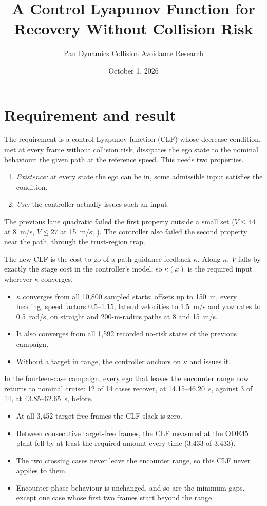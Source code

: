\documentclass[11pt]{article}
\title{A Control Lyapunov Function for Recovery Without Collision Risk}
\author{Pan Dynamics Collision Avoidance Research}
\date{October 1, 2026}
\begin{document}
\maketitle

\section{Requirement and result}
The requirement is a control Lyapunov function (CLF) whose decrease condition,
met at every frame without collision risk, dissipates the ego state to the
nominal behaviour: the given path at the reference speed. This needs two
properties.
\begin{enumerate}
\item \emph{Existence:} at every state the ego can be in, some admissible input
satisfies the condition.
\item \emph{Use:} the controller actually issues such an input.
\end{enumerate}
The previous lane quadratic failed the first property outside a small set
($V\le44$ at 8~m/s, $V\le27$ at 15~m/s;
). The controller also failed the
second property near the path, through the trust-region trap.

The new CLF is the cost-to-go of a path-guidance feedback $\kappa$. Along
$\kappa$, $V$ falls by exactly the stage cost in the controller's model, so
$\kappa(x)$ is the required input wherever $\kappa$ converges.
\begin{itemize}
\item $\kappa$ converges from all 10{,}800 sampled starts: offsets up to
150~m, every heading, speed factors 0.5--1.15, lateral velocities to 1.5~m/s
and yaw rates to 0.5~rad/s, on straight and 200-m-radius paths at 8 and
15~m/s.
\item It also converges from all 1{,}592 recorded no-risk states of the
previous campaign.
\item Without a target in range, the controller anchors on $\kappa$ and issues
it.
\end{itemize}
In the fourteen-case campaign, every ego that leaves the encounter range now
returns to nominal cruise: 12 of 14 cases recover, at 14.15--46.20~s,
against 3 of 14, at 43.85--62.65~s, before.
\begin{itemize}
\item At all 3{,}452 target-free frames the CLF slack is zero.
\item Between consecutive target-free frames, the CLF measured at the ODE45
plant fell by at least the required amount every time (3{,}433 of 3{,}433).
\item The two crossing cases never leave the encounter range, so this CLF never
applies to them.
\item Encounter-phase behaviour is unchanged, and so are the minimum gaps,
except one case whose first two frames start beyond the range.
\end{itemize}
\end{document}
